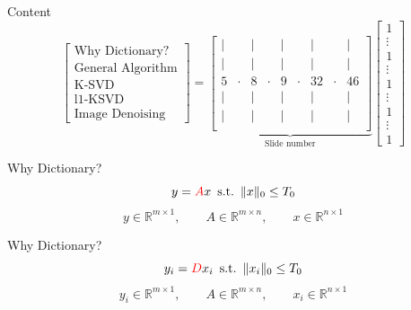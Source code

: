 \documentclass{beamer}
\begin{document}
\begin{frame}{Content}
    \[
    \left[
    \begin{array}{l}
        \text{Why Dictionary?} \\[0.45em]
        \text{General Algorithm} \\[0.45em]
        \text{K-SVD} \\[0.45em]
        \text{l1-KSVD} \\[0.45em]
        \text{Image Denoising}
    \end{array}
    \right]
    =
    \underbrace{
    \left[
    \begin{array}{ccccccccc}
    | &       & | &        & | &        & | &     &    | \\
    | &       & | &        & | &        & | &     &     | \\
    5 & \cdot & 8 & \cdot & 9 & \cdot & 32 & \cdot & 46 \\
    | &       & | &        & | &        & | &     &   | \\
    | &       & | &        & | &        & | &     &   | \\
    \end{array}
    \right]}_{\text{Slide number}}
    \left[
    \begin{array}{c}
        1 \\
        \vdots \\
        1 \\
        \vdots \\
        1 \\
        \vdots \\
        1 \\
        \vdots \\
        1
    \end{array}
    \right]
    \]
\end{frame}


\begin{frame}{Why Dictionary?}
    \vspace{0.001cm}
    {\huge
    \[
    y = {\color{red}A}x \phantom{1} \text{s.t.} \phantom{1} \|x\|_0 \leq T_0
    \]
    }
    \[
    y \in \mathbb{R}^{m \times 1}, \qquad
    A \in \mathbb{R}^{m \times n}, \qquad
    x \in \mathbb{R}^{n \times 1}
    \]
\end{frame}

\begin{frame}{Why Dictionary?}
    \vspace{0.1cm}
    {\huge
    \[
    y_i = {\color{red}D}x_i \phantom{1} \text{s.t.} \phantom{1} \|x_i\|_0 \leq T_0
    \]
    }
    \[
    y_i \in \mathbb{R}^{m \times 1}, \qquad
    A \in \mathbb{R}^{m \times n}, \qquad
    x_i \in \mathbb{R}^{n \times 1}
    \]
\end{frame}
\end{document}
